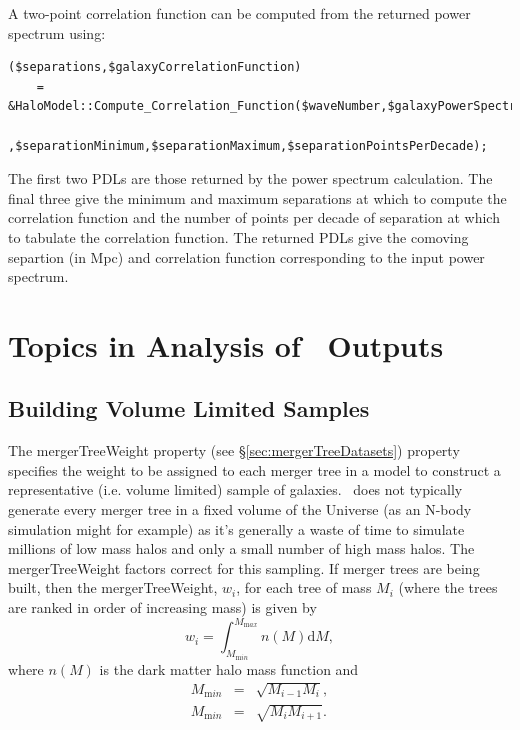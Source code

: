 A two-point correlation function can be computed from the returned power spectrum using:
\begin{verbatim}
($separations,$galaxyCorrelationFunction) 
    = &HaloModel::Compute_Correlation_Function($waveNumber,$galaxyPowerSpectrum
        ,$separationMinimum,$separationMaximum,$separationPointsPerDecade);
\end{verbatim}
The first two PDLs are those returned by the power spectrum calculation. The final three give the minimum and maximum separations at which to compute the correlation function and the number of points per decade of separation at which to tabulate the correlation function. The returned PDLs give the comoving separtion (in Mpc) and correlation function corresponding to the input power spectrum.

\section{Topics in Analysis of \glc\ Outputs}

\subsection{Building Volume Limited Samples}\label{sec:volumeLimitedSamples}

The {\normalfont \ttfamily mergerTreeWeight} property (see \S\ref{sec:mergerTreeDatasets}) property specifies the weight to be assigned to each merger tree in a model to construct a representative (i.e. volume limited) sample of galaxies. \glc\ does not typically generate every merger tree in a fixed volume of the Universe (as an N-body simulation might for example) as it's generally a waste of time to simulate millions of low mass halos and only a small number of high mass halos. The {\normalfont \ttfamily mergerTreeWeight} factors correct for this sampling. If merger trees are being built, then the {\normalfont \ttfamily mergerTreeWeight}, $w_i$, for each tree of mass $M_i$ (where the trees are ranked in order of increasing mass) is given by
\begin{equation}
 w_i = \int_{M_{\mathrm min}}^{M_{\mathrm max}} n(M) {\mathrm d}M,
\end{equation}
where $n(M)$ is the dark matter halo mass function and
\begin{eqnarray}
 M_{\mathrm min} &=& \sqrt{M_{i-1}M_i}, \\
 M_{\mathrm min} &=& \sqrt{M_i M_{i+1}}.
\end{eqnarray}

